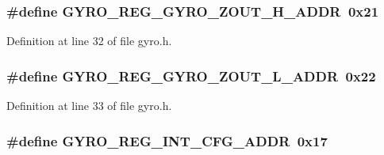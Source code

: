 \subsubsection[{\texorpdfstring{G\+Y\+R\+O\+\_\+\+R\+E\+G\+\_\+\+G\+Y\+R\+O\+\_\+\+Z\+O\+U\+T\+\_\+\+H\+\_\+\+A\+D\+DR}{GYRO_REG_GYRO_ZOUT_H_ADDR}}]{\setlength{\rightskip}{0pt plus 5cm}\#define G\+Y\+R\+O\+\_\+\+R\+E\+G\+\_\+\+G\+Y\+R\+O\+\_\+\+Z\+O\+U\+T\+\_\+\+H\+\_\+\+A\+D\+DR~0x21}\hypertarget{group___gyro_gab41f7d5bb2d6ff24ea5fc5072e5e0cd6}{}\label{group___gyro_gab41f7d5bb2d6ff24ea5fc5072e5e0cd6}


Definition at line 32 of file gyro.\+h.

\subsubsection[{\texorpdfstring{G\+Y\+R\+O\+\_\+\+R\+E\+G\+\_\+\+G\+Y\+R\+O\+\_\+\+Z\+O\+U\+T\+\_\+\+L\+\_\+\+A\+D\+DR}{GYRO_REG_GYRO_ZOUT_L_ADDR}}]{\setlength{\rightskip}{0pt plus 5cm}\#define G\+Y\+R\+O\+\_\+\+R\+E\+G\+\_\+\+G\+Y\+R\+O\+\_\+\+Z\+O\+U\+T\+\_\+\+L\+\_\+\+A\+D\+DR~0x22}\hypertarget{group___gyro_gab8e92412676e8733bad045671a91a897}{}\label{group___gyro_gab8e92412676e8733bad045671a91a897}


Definition at line 33 of file gyro.\+h.

\subsubsection[{\texorpdfstring{G\+Y\+R\+O\+\_\+\+R\+E\+G\+\_\+\+I\+N\+T\+\_\+\+C\+F\+G\+\_\+\+A\+D\+DR}{GYRO_REG_INT_CFG_ADDR}}]{\setlength{\rightskip}{0pt plus 5cm}\#define G\+Y\+R\+O\+\_\+\+R\+E\+G\+\_\+\+I\+N\+T\+\_\+\+C\+F\+G\+\_\+\+A\+D\+DR~0x17}\hypertarget{group___gyro_ga670e2cfed8990ed32464824e71c69ed1}{}\label{group___gyro_ga670e2cfed8990ed32464824e71c69ed1}


